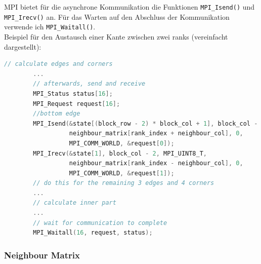 \documentclass[german,plainarticle,hyperref,utf8]{zihpub}
\begin{document}
	MPI bietet für die asynchrone Kommunikation die Funktionen \texttt{MPI\_Isend()} und \texttt{MPI\_Irecv()} an. Für das Warten auf den Abschluss der Kommunikation verwende ich \texttt{MPI\_Waitall()}.\\
	Beispiel für den Austausch einer Kante zwischen zwei ranks (vereinfacht dargestellt):
		\begin{lstlisting}[language=C, caption=Asynchrone Kommunikation zwischen 2 ranks]
		// calculate edges and corners
		...
		// afterwards, send and receive
		MPI_Status status[16];
		MPI_Request request[16];
		//bottom edge
		MPI_Isend(&state[(block_row - 2) * block_col + 1], block_col - 2, MPI_UINT8_T,
		          neighbour_matrix[rank_index + neighbour_col], 0,
		          MPI_COMM_WORLD, &request[0]);
		MPI_Irecv(&state[1], block_col - 2, MPI_UINT8_T,
		          neighbour_matrix[rank_index - neighbour_col], 0,
		          MPI_COMM_WORLD, &request[1]);
		// do this for the remaining 3 edges and 4 corners
		...
		// calculate inner part
		...
		// wait for communication to complete
		MPI_Waitall(16, request, status);
	\end{lstlisting}
	
	\subsubsection{Neighbour Matrix}
	
\end{document}
